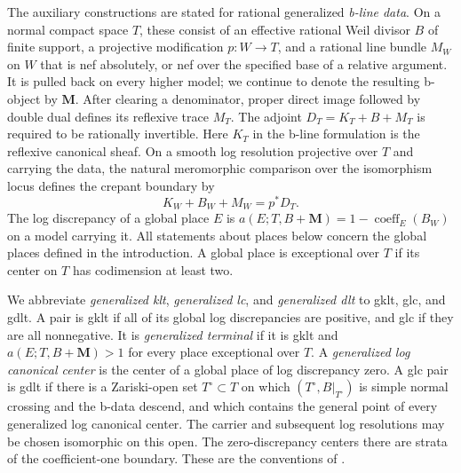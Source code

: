 \documentclass[11pt]{amsart}
\theoremstyle{definition}
\theoremstyle{remark}
\numberwithin{equation}{section}
\newcommand{\M}{\mathbf{M}}
\begin{document}
The auxiliary constructions are stated for rational generalized
\emph{b-line data}.  On a normal compact space \(T\), these consist of an
effective rational Weil divisor \(B\) of finite support, a projective
modification \(p:W\to T\), and a rational line bundle \(M_W\) on \(W\)
that is nef absolutely, or nef over the specified base of a relative
argument.  It is pulled back on every higher model; we continue to denote
the resulting b-object by \(\M\).  After clearing a denominator, proper
direct image followed by double dual defines its reflexive trace \(M_T\).
The adjoint \(D_T=K_T+B+M_T\) is required to be rationally invertible.
Here \(K_T\) in the b-line formulation is the reflexive canonical sheaf.
On a smooth log resolution projective over \(T\) and carrying the data, the natural
meromorphic comparison over the isomorphism locus defines the crepant
boundary by
\[
 K_W+B_W+M_W=p^*D_T.
\]
The log discrepancy of a global place \(E\) is
\(a(E;T,B+\M)=1-\operatorname{coeff}_E(B_W)\) on a model carrying it.
All statements about places below concern the global places defined in the
introduction.  A global place is exceptional over \(T\) if its center on
\(T\) has codimension at least two.

We abbreviate \emph{generalized klt}, \emph{generalized lc}, and
\emph{generalized dlt} to gklt, glc, and gdlt.  A pair is gklt if all of
its global log discrepancies are positive, and glc if they are all
nonnegative.  It is \emph{generalized terminal} if it is gklt and
\(a(E;T,B+\M)>1\) for every place exceptional over \(T\).  A
\emph{generalized log canonical center} is the center of a global place of
log discrepancy zero.  A glc pair is gdlt if there is a Zariski-open set
\(T^\circ\subset T\) on which \((T^\circ,B|_{T^\circ})\) is simple normal
crossing and the b-data descend, and which contains the general point of
every generalized log canonical center.  The carrier and subsequent log
resolutions may be chosen isomorphic on this open.  The zero-discrepancy
centers there are strata of the coefficient-one boundary.  These are the
conventions of \cite[Convention~9.1 and Definition~9.2]{KahlerAuxiliary}.
\end{document}

